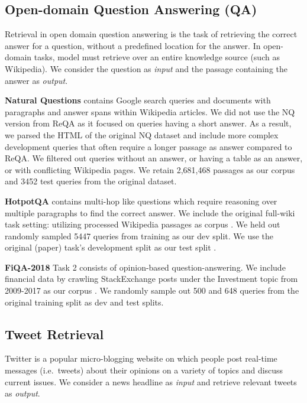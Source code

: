 \documentclass{article}
\begin{document}
\subsection{Open-domain Question Answering (QA)}
\vspace{-2mm}

Retrieval in open domain question answering \cite{chen-etal-2017-reading} is the task of retrieving the correct answer for a question, without a predefined location for the answer. In open-domain tasks, model must retrieve over an entire knowledge source (such as Wikipedia). We consider the question as \textit{input} and the passage containing the answer as \textit{output}.

\textbf{Natural Questions} \cite{47761} contains Google search queries and documents with paragraphs and answer spans within Wikipedia articles. We did not use the NQ version from ReQA \cite{ahmad-etal-2019-reqa} as it focused on queries having a short answer. As a result, we parsed the HTML of the original NQ dataset and include more complex development queries that often require a longer passage as answer compared to ReQA. We filtered out queries without an answer, or having a table as an answer, or with conflicting Wikipedia pages. We retain 2,681,468 passages as our corpus  and 3452 test queries  from the original dataset.

\textbf{HotpotQA} \cite{yang-etal-2018-hotpotqa} contains multi-hop like questions which require reasoning over multiple paragraphs to find the correct answer. We include the original full-wiki task setting: utilizing processed Wikipedia passages as corpus . We held out randomly sampled 5447 queries from training as our dev split. We use the original (paper) task's development split as our test split .

 \textbf{FiQA-2018} \cite{10.1145/3184558.3192301} Task 2 consists of opinion-based question-answering. We include financial data by crawling StackExchange posts under the Investment topic from 2009-2017 as our corpus . We randomly sample out 500 and 648 queries  from the original training split as dev and test splits.

\vspace{-2mm}
\subsection{Tweet Retrieval}
\vspace{-1mm}
Twitter is a popular micro-blogging website on which people post real-time messages (i.e.\ tweets) about their opinions on a variety of topics and discuss current issues. We consider a news headline as \textit{input} and retrieve relevant tweets as \textit{output}.
\end{document}
